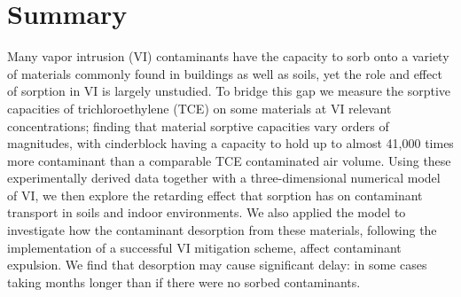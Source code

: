 \section{Summary}

Many vapor intrusion (VI) contaminants have the capacity to sorb onto a variety of materials commonly found in buildings as well as soils, yet the role and effect of sorption in VI is largely unstudied.
To bridge this gap we measure the sorptive capacities of trichloroethylene (TCE) on some materials at VI relevant concentrations; finding that material sorptive capacities vary orders of magnitudes, with cinderblock having a capacity to hold up to almost 41,000 times more contaminant than a comparable TCE contaminated air volume.
Using these experimentally derived data together with a three-dimensional numerical model of VI, we then explore the retarding effect that sorption has on contaminant transport in soils and indoor environments.
We also applied the model to investigate how the contaminant desorption from these materials, following the implementation of a successful VI mitigation scheme, affect contaminant expulsion.
We find that desorption may cause significant delay: in some cases taking months longer than if there were no sorbed contaminants.

